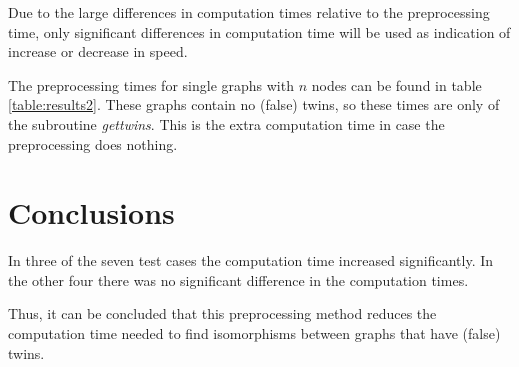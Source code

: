 \documentclass[twoside]{article}
\theoremstyle{definition}
\theoremstyle{plain}
\begin{document}
\begin{multicols}{2}
Due to the large differences in computation times relative to the preprocessing time, only significant differences in computation time will be used as indication of increase or decrease in speed.

The preprocessing times for single graphs with $n$ nodes can be found in table \ref{table:results2}. These graphs contain no (false) twins, so these times are  only of the subroutine \emph{gettwins}. This is the extra computation time in case the preprocessing does nothing. 

\section{Conclusions}

In three of the seven test cases the computation time increased significantly. In the other four there was no significant difference in the computation times.

Thus, it can be concluded that this preprocessing method reduces the computation time needed to find isomorphisms between graphs that have (false) twins.


\printbibliography




\end{multicols}
\end{document}
